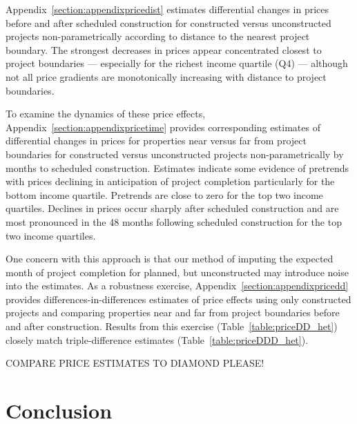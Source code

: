 \documentclass[12pt]{article}
\begin{document}
Appendix~\ref{section:appendixpricedist} estimates differential changes in prices before and after scheduled construction for constructed versus unconstructed projects non-parametrically according to distance to the nearest project boundary.  The strongest decreases in prices appear concentrated closest to project boundaries --- especially for the richest income quartile (Q4) --- although not all price gradients are monotonically increasing with distance to project boundaries.  

To examine the dynamics of these price effects, Appendix~\ref{section:appendixpricetime} provides corresponding estimates of differential changes in prices for properties near versus far from project boundaries for constructed versus unconstructed projects non-parametrically by months to scheduled construction.  Estimates indicate some evidence of pretrends with prices declining in anticipation of project completion particularly for the bottom income quartile.  Pretrends are close to zero for the top two income quartiles.  Declines in prices occur sharply after scheduled construction and are most pronounced in the 48 months following scheduled construction for the top two income quartiles.

One concern with this approach is that our method of imputing the expected month of project completion for planned, but unconstructed  may introduce noise into the estimates.  As a robustness exercise, Appendix~\ref{section:appendixpricedd} provides differences-in-differences estimates of price effects using only constructed projects and comparing properties near and far from project boundaries before and after construction.  Results from this exercise (Table~\ref{table:priceDD_het}) closely match triple-difference estimates (Table~\ref{table:priceDDD_het}).


COMPARE PRICE ESTIMATES TO DIAMOND PLEASE!





\section{Conclusion}\label{section:discussion}
\end{document}

